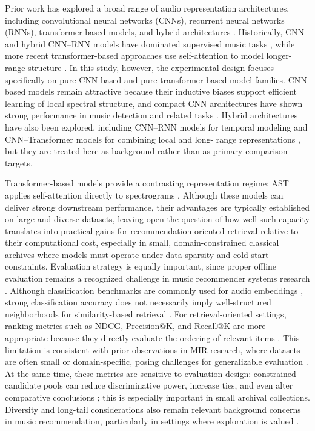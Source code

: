 \documentclass{article}
\begin{document}
Prior work has explored a broad range of audio representation architectures, including convolutional
neural networks (CNNs), recurrent neural networks (RNNs), transformer-based models, and hybrid
architectures \cite{zaman2023}. Historically, CNN and hybrid CNN–RNN models have dominated supervised
music tasks \cite{jiang2024}, while more recent transformer-based approaches use self-attention to
model longer-range structure \cite{zaman2023}. In this study, however, the experimental design
focuses specifically on pure CNN-based and pure transformer-based model families.
CNN-based models remain attractive because their inductive biases support efficient learning of local
spectral structure, and compact CNN architectures have shown strong performance in music detection
and related tasks \cite{kong2020panns}. Hybrid architectures have also been explored, including CNN–RNN
models for temporal modeling \cite{lin2024} and CNN–Transformer models for combining local and long-
range representations \cite{pourmoazemi2024}, but they are treated here as background rather than as
primary comparison targets.

Transformer-based models provide a contrasting representation regime: AST applies self-attention
directly to spectrograms \cite{gong2021ast}. Although these models can deliver strong downstream
performance, their advantages are typically established on large and diverse datasets, leaving open the question of how well such capacity translates into practical gains for recommendation-oriented retrieval relative to their computational cost, especially in small, domain-constrained classical archives where models must operate under data sparsity and cold-start constraints.
Evaluation strategy is equally important, since proper offline evaluation remains a recognized challenge in music recommender systems research \cite{schedl2018}. Although classification benchmarks are commonly used for audio embeddings \cite{gong2021ast, zaman2023}, strong classification accuracy does not necessarily imply well-structured neighborhoods for similarity-based retrieval \cite{tamm2024}. For retrieval-oriented settings, ranking metrics such as NDCG, Precision@K, and Recall@K are more appropriate because they directly evaluate the ordering of relevant items \cite{krichene2020}. This limitation is consistent with prior observations in MIR research, where datasets are often small or domain-specific, posing challenges for generalizable evaluation \cite{urbano2013}.
At the same time, these metrics are sensitive to evaluation design: constrained candidate pools can reduce discriminative power, increase ties, and even alter comparative conclusions \cite{krichene2020, canamares2020}; this is especially important in small archival collections. Diversity and long-tail considerations also remain relevant background concerns in music recommendation, particularly in settings where exploration is valued \cite{porcaro2022}.
\end{document}
